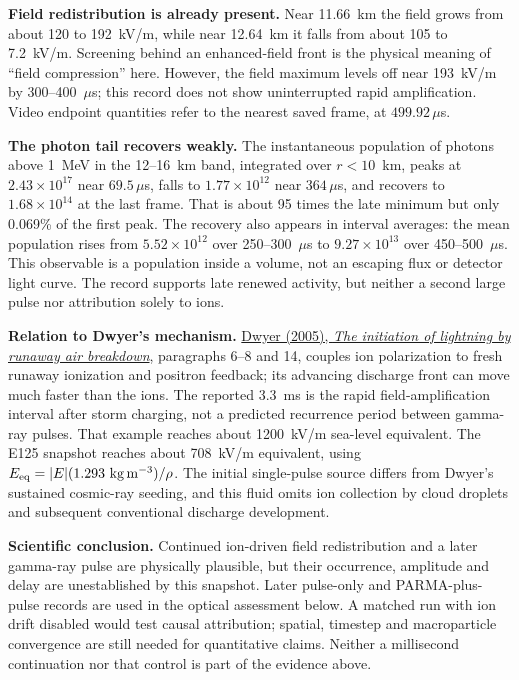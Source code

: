 \documentclass[11pt]{article}
\begin{document}
\textbf{Field redistribution is already present.} Near 11.66~km the field
grows from about 120 to 192~kV/m, while near 12.64~km it falls from about
105 to 7.2~kV/m. Screening behind an enhanced-field front is the physical
meaning of ``field compression'' here. However, the field maximum levels
off near 193~kV/m by 300--400~$\mu$s; this record does not show uninterrupted
rapid amplification. Video endpoint quantities refer to the nearest saved
frame, at $499.92\,\mu$s.

\textbf{The photon tail recovers weakly.} The instantaneous population of
photons above 1~MeV in the 12--16~km band, integrated over $r<10$~km, peaks
at $2.43\times10^{17}$ near $69.5\,\mu$s, falls to $1.77\times10^{12}$ near
$364\,\mu$s, and recovers to $1.68\times10^{14}$ at the last frame. That is
about 95 times the late minimum but only 0.069\% of the first peak. The
recovery also appears in interval averages: the mean population rises from
$5.52\times10^{12}$ over 250--300~$\mu$s to $9.27\times10^{13}$ over
450--500~$\mu$s. This observable is a population inside a volume, not an
escaping flux or detector light curve. The record supports late renewed
activity, but neither a second large pulse nor attribution solely to ions.

\textbf{Relation to Dwyer's mechanism.}
\href{https://doi.org/10.1029/2005GL023975}{Dwyer (2005),
\emph{The initiation of lightning by runaway air breakdown}}, paragraphs
6--8 and 14, couples ion polarization to fresh runaway ionization and
positron feedback; its advancing discharge front can move much faster than
the ions. The reported 3.3~ms is the rapid field-amplification interval after
storm charging, not a predicted recurrence period between gamma-ray pulses.
That example reaches about 1200~kV/m sea-level equivalent. The E125 snapshot
reaches about 708~kV/m equivalent, using
$E_{\rm eq}=|E|(1.293~\mathrm{kg\,m^{-3}})/\rho$.
The initial single-pulse source differs from Dwyer's sustained cosmic-ray
seeding, and this fluid omits ion collection by cloud droplets and subsequent
conventional discharge development.

\textbf{Scientific conclusion.} Continued ion-driven field redistribution
and a later gamma-ray pulse are physically plausible, but their occurrence,
amplitude and delay are unestablished by this snapshot. Later pulse-only and
PARMA-plus-pulse records are used in the optical assessment below.
A matched run with ion drift disabled would
test causal attribution; spatial, timestep and macroparticle convergence are
still needed for quantitative claims. Neither a millisecond continuation nor
that control is part of the evidence above.
\end{document}
